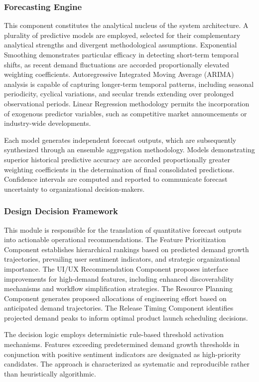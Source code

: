 \subsubsection{Forecasting Engine}
This component constitutes the analytical nucleus of the system architecture. A plurality of predictive models are employed, selected for their complementary analytical strengths and divergent methodological assumptions. Exponential Smoothing demonstrates particular efficacy in detecting short-term temporal shifts, as recent demand fluctuations are accorded proportionally elevated weighting coefficients. Autoregressive Integrated Moving Average (ARIMA) analysis is capable of capturing longer-term temporal patterns, including seasonal periodicity, cyclical variations, and secular trends extending over prolonged observational periods. Linear Regression methodology permits the incorporation of exogenous predictor variables, such as competitive market announcements or industry-wide developments.

Each model generates independent forecast outputs, which are subsequently synthesized through an ensemble aggregation methodology. Models demonstrating superior historical predictive accuracy are accorded proportionally greater weighting coefficients in the determination of final consolidated predictions. Confidence intervals are computed and reported to communicate forecast uncertainty to organizational decision-makers.

\subsubsection{Design Decision Framework}
This module is responsible for the translation of quantitative forecast outputs into actionable operational recommendations. The Feature Prioritization Component establishes hierarchical rankings based on predicted demand growth trajectories, prevailing user sentiment indicators, and strategic organizational importance. The UI/UX Recommendation Component proposes interface improvements for high-demand features, including enhanced discoverability mechanisms and workflow simplification strategies. The Resource Planning Component generates proposed allocations of engineering effort based on anticipated demand trajectories. The Release Timing Component identifies projected demand peaks to inform optimal product launch scheduling decisions.

The decision logic employs deterministic rule-based threshold activation mechanisms. Features exceeding predetermined demand growth thresholds in conjunction with positive sentiment indicators are designated as high-priority candidates. The approach is characterized as systematic and reproducible rather than heuristically algorithmic.

